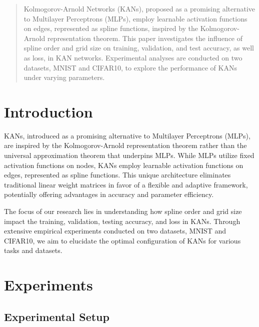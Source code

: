 \documentclass{article}
\begin{document}






\begin{abstract}
Kolmogorov-Arnold Networks (KANs), proposed as a promising alternative to Multilayer Perceptrons (MLPs),
employ learnable activation functions on edges, represented as spline functions, inspired by the Kolmogorov-Arnold representation theorem.
This paper investigates the influence of spline order and grid size on training, validation, and test accuracy, as well as loss, in KAN networks.
Experimental analyses are conducted on two datasets, MNIST and CIFAR10, to explore the performance of KANs under varying parameters.
\end{abstract}

\section{Introduction}\label{sec:introduction}

KANs\cite{liu2024kan}, introduced as a promising alternative to Multilayer Perceptrons (MLPs),
are inspired by the Kolmogorov-Arnold representation theorem rather than the universal approximation theorem that underpins MLPs.
While MLPs utilize fixed activation functions on nodes, KANs employ learnable activation functions on edges, represented as spline functions.
This unique architecture eliminates traditional linear weight matrices in favor of a flexible and adaptive framework, potentially offering advantages in accuracy and parameter efficiency.

The focus of our research lies in understanding how spline order and grid size impact the training, validation, testing accuracy, and loss in KANs.
Through extensive empirical experiments conducted on two datasets, MNIST and CIFAR10, we aim to elucidate the optimal configuration of KANs for various tasks and datasets.

\section{Experiments}\label{sec:experiments}

\subsection{Experimental Setup}\label{subsec:experimental-setup}
\end{document}
